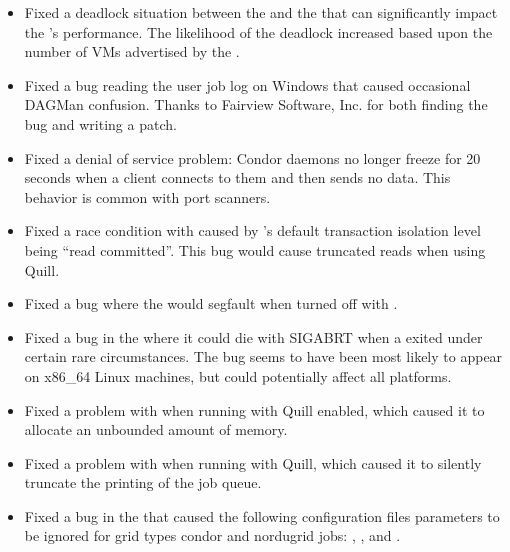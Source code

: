 \begin{itemize}

\item Fixed a deadlock situation between the  and
the  that can
significantly impact the 's performance.  The likelihood of the
deadlock increased based upon the number of VMs advertised by the
.

\item Fixed a bug reading the user job log on Windows that caused
occasional DAGMan confusion.
Thanks to Fairview Software, Inc. for
both finding the bug and writing a patch.

\item Fixed a denial of service problem: Condor daemons no longer freeze
for 20 seconds when a client connects to them and then sends no data.
This behavior is common with port scanners.

\item Fixed a race condition with  caused by
's default transaction isolation level being ``read
committed''. 
This bug would cause truncated  reads when using Quill.

\item Fixed a bug where the  would segfault when
turned off with  .

\item Fixed a bug in the  where it could die with
  SIGABRT when a  exited under certain rare
  circumstances.
  The bug seems to have been most likely to appear on x86\_64 Linux
  machines, but could potentially affect all platforms.

\item Fixed a problem with  when running with Quill enabled,
which caused it to allocate an unbounded amount of memory.

\item Fixed a problem with  when running with Quill, which caused
it to silently truncate the printing of the job queue.

\item Fixed a bug in the  that caused the following
configuration files parameters to be ignored for grid types condor and
nordugrid jobs: ,
, and
.


\end{itemize}
